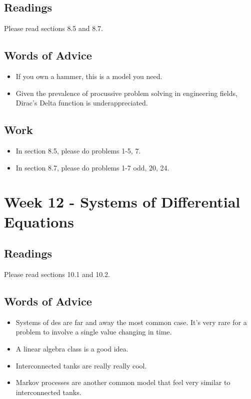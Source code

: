 	\subsection{Readings}
		Please read sections 8.5 and 8.7.

	\subsection{Words of Advice}
		\begin{itemize}
			\item If you own a hammer, this is a model you need.
			\item Given the prevalence of procussive problem solving in engineering fields, Dirac's Delta function is underappreciated.
		\end{itemize}

	\subsection{Work}
		\begin{itemize}
			\item In section 8.5, please do problems 1-5, 7.
			\item In section 8.7, please do problems 1-7 odd, 20, 24.
		\end{itemize}

	\clearpage



	\section{Week 12 - Systems of Differential Equations}

	\subsection{Readings}
		Please read sections 10.1 and 10.2.

	\subsection{Words of Advice}
		\begin{itemize}
			\item Systems of des are far and away the most common case. It's very rare for a problem to involve a single value changing in time.
			\item A linear algebra class is a good idea.
			\item Interconnected tanks are really really cool.
			\item Markov processes are another common model that feel very similar to interconnected tanks.
		\end{itemize}


